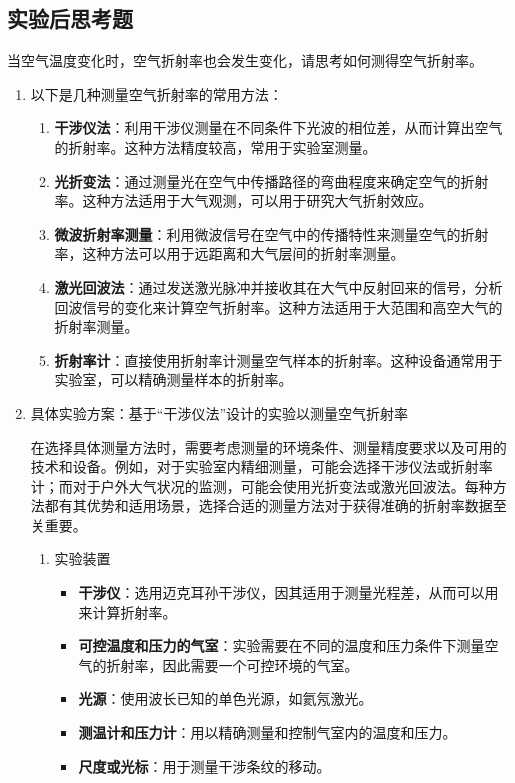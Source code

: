 \documentclass[dvipsnames, svgnames,a4paper,11pt]{article}
\begin{document}
	
	\clearpage
	\subsection{实验后思考题}
	
	\begin{question}
		当空气温度变化时，空气折射率也会发生变化，请思考如何测得空气折射率。
	\end{question}
	\begin{enumerate}
		\item 以下是几种测量空气折射率的常用方法：
		
		\begin{enumerate}
			\item \textbf{干涉仪法}：利用干涉仪测量在不同条件下光波的相位差，从而计算出空气的折射率。这种方法精度较高，常用于实验室测量。
			
			\item \textbf{光折变法}：通过测量光在空气中传播路径的弯曲程度来确定空气的折射率。这种方法适用于大气观测，可以用于研究大气折射效应。
			
			\item \textbf{微波折射率测量}：利用微波信号在空气中的传播特性来测量空气的折射率，这种方法可以用于远距离和大气层间的折射率测量。
			
			\item \textbf{激光回波法}：通过发送激光脉冲并接收其在大气中反射回来的信号，分析回波信号的变化来计算空气折射率。这种方法适用于大范围和高空大气的折射率测量。
			
			\item \textbf{折射率计}：直接使用折射率计测量空气样本的折射率。这种设备通常用于实验室，可以精确测量样本的折射率。
		\end{enumerate}
		
		\item 具体实验方案：基于“干涉仪法”设计的实验以测量空气折射率
		
		在选择具体测量方法时，需要考虑测量的环境条件、测量精度要求以及可用的技术和设备。例如，对于实验室内精细测量，可能会选择干涉仪法或折射率计；而对于户外大气状况的监测，可能会使用光折变法或激光回波法。每种方法都有其优势和适用场景，选择合适的测量方法对于获得准确的折射率数据至关重要。
		
		\begin{enumerate}
			\item 实验装置
			\begin{itemize}
				\item \textbf{干涉仪}：选用迈克耳孙干涉仪，因其适用于测量光程差，从而可以用来计算折射率。
				\item \textbf{可控温度和压力的气室}：实验需要在不同的温度和压力条件下测量空气的折射率，因此需要一个可控环境的气室。
				\item \textbf{光源}：使用波长已知的单色光源，如氦氖激光。
				\item \textbf{测温计和压力计}：用以精确测量和控制气室内的温度和压力。
				\item \textbf{尺度或光标}：用于测量干涉条纹的移动。
			\end{itemize}
			

\end{enumerate}
\end{enumerate}
\end{document}
